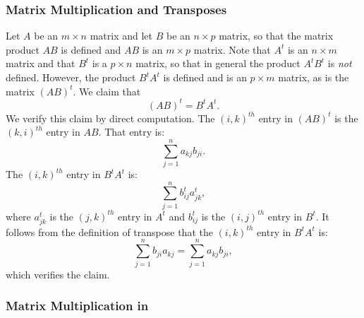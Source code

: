 \documentclass{ximera}
\begin{document}
\subsubsection*{Matrix Multiplication and Transposes}

Let $A$ be an $m\times n$ matrix and let $B$ be an $n\times p$
matrix, so that the matrix product $AB$ is defined and $AB$ is an
$m\times p$ matrix.  Note that $A^t$
is an $n\times m$ matrix and that $B^t$ is a $p\times n$ matrix, so
that in general the product $A^tB^t$ is {\em not\/} defined.  However,
the product $B^tA^t$ is defined and is an $p\times m$ matrix, as is
the matrix $(AB)^t$.  We claim that
\begin{equation}  \label{e:transposeprod}
(AB)^t = B^tA^t.
\end{equation}
We verify this claim by direct computation.  The $(i,k)^{th}$ entry
in $(AB)^t$ is the $(k,i)^{th}$ entry in $AB$.   That entry is:
\[
\sum_{j=1}^{n} a_{kj}b_{ji}.
\]
The $(i,k)^{th}$ entry in $B^tA^t$ is:
\[
\sum_{j=1}^n b^t_{ij}a^t_{jk},
\]
where $a^t_{jk}$ is the $(j,k)^{th}$ entry in $A^t$ and $b^t_{ij}$
is the $(i,j)^{th}$ entry in $B^t$.  It follows from the definition
of transpose that the $(i,k)^{th}$ entry in $B^tA^t$ is:
\[
\sum_{j=1}^n b_{ji}a_{kj} = \sum_{j=1}^n a_{kj}b_{ji},
\]
which verifies the claim.


\subsubsection*{Matrix Multiplication in \Matlab}
\end{document}
